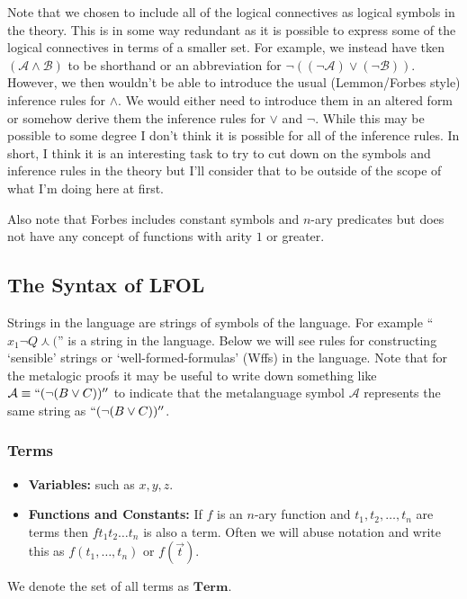 \documentclass[12pt]{article}
\newcommand{\mc}[1]{\mathcal{#1}}
\begin{document}
Note that we chosen to include all of the logical connectives as logical symbols in the theory. This is in some way redundant as it is possible to express some of the logical connectives in terms of a smaller set. For example, we instead have tken $(\mc{A} \land \mc{B})$ to be shorthand or an abbreviation for $\lnot((\lnot\mc{A})\lor(\lnot \mc{B}))$. However, we then wouldn't be able to introduce the usual (Lemmon/Forbes style) inference rules for $\land$. We would either need to introduce them in an altered form or somehow derive them the inference rules for $\lor$ and $\lnot$.  While this may be possible to some degree I don't think it is possible for all of the inference rules. In short, I think it is an interesting task to try to cut down on the symbols and inference rules in the theory but I'll consider that to be outside of the scope of what I'm doing here at first.

Also note that Forbes includes constant symbols and $n$-ary predicates but does not have any concept of functions with arity $1$ or greater.

\subsection*{The Syntax of LFOL}

Strings in the language are strings of symbols of the language. For example ``$x_1 \lnot Q \curlywedge ($'' is a string in the language. Below we will see rules for constructing `sensible' strings or `well-formed-formulas' (Wffs) in the language. Note that for the metalogic proofs it may be useful to write down something like $\mc{A} \equiv ``(\lnot(B\lor C))''$ to indicate that the metalanguage symbol $\mc{A}$ represents the same string as $``(\lnot(B \lor C))''$.

\hrulefill
\subsubsection*{Terms}
\begin{itemize}
\item{\textbf{Variables:} such as $x,y,z$.}
\item{\textbf{Functions and Constants:} If $f$ is an $n$-ary function and $t_1,t_2,\ldots, t_n$ are terms then $ft_1t_2\ldots t_n$ is also a term. Often we will abuse notation and write this as $f(t_1,
\ldots,t_n)$ or $f(\vec{t})$.}
\end{itemize}

We denote the set of all terms as $\mathbf{Term}$.
\end{document}
